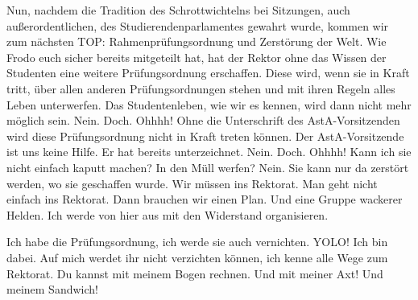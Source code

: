 \begin{verseplay}[10em]
\s{\Elron} Nun, nachdem die Tradition des Schrottwichtelns bei Sitzungen, auch außerordentlichen, des Studierendenparlamentes gewahrt wurde, kommen wir zum nächsten TOP: Rahmenprüfungsordnung und Zerstörung der Welt.
\s{\Gandalf} Wie Frodo euch sicher bereits mitgeteilt hat, hat der Rektor ohne das Wissen der Studenten eine weitere Prüfungsordnung erschaffen.
\s{\Gandalf} Diese wird, wenn sie in Kraft tritt, über allen anderen Prüfungsordnungen stehen und mit ihren Regeln alles Leben unterwerfen. Das Studentenleben, wie wir es kennen, wird dann nicht mehr möglich sein.
\s{\Elron} Nein.
\s{\Gandalf} Doch.
 Ohhhh!
\s{\Elron}  Ohne die Unterschrift des AstA-Vorsitzenden wird diese Prüfungsordnung nicht in Kraft treten können.
\s{\Gandalf} Der AstA-Vorsitzende ist uns keine Hilfe. Er hat bereits unterzeichnet.
\s{\Elron} Nein.
\s{\Gandalf} Doch.
 Ohhhh!
\s{\Frodo} Kann ich sie nicht einfach kaputt machen? In den Müll werfen?
\s{\Gandalf} Nein. Sie kann nur da zerstört werden, wo sie geschaffen wurde. Wir müssen ins Rektorat.
\s{\Elron} Man geht nicht einfach ins Rektorat.
\s{\Gimli} Dann brauchen wir einen Plan. Und eine Gruppe wackerer Helden.
\s{\Elron} Ich werde von hier aus mit \Galadriel den Widerstand organisieren.

\s{\Frodo} Ich habe die Prüfungsordnung, ich werde sie auch vernichten. 
\s{\Sum} YOLO! Ich bin dabei.
\s{\Gandalf} Auf mich werdet ihr nicht verzichten können, ich kenne alle Wege zum Rektorat.
\s{\Legolars} Du kannst mit meinem Bogen rechnen. 
\s{\Gimli} Und mit meiner Axt! Und meinem Sandwich! 


\end{verseplay}
